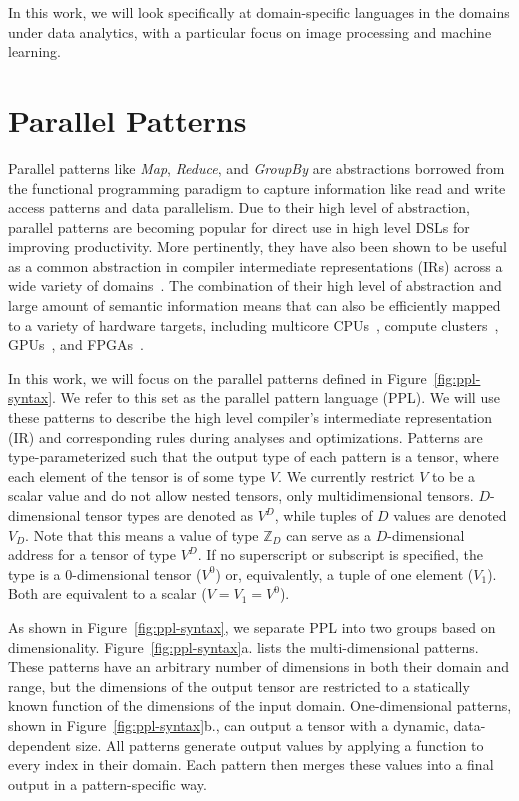 In this work, we will look specifically at domain-specific languages in the domains under
data analytics, with a particular focus on image processing and machine learning.


\section{Parallel Patterns}

Parallel patterns like \emph{Map}, \emph{Reduce}, and \emph{GroupBy} are abstractions
borrowed from the functional programming paradigm
to capture information like read and write access patterns and data parallelism.
Due to their high level of abstraction, parallel patterns are becoming
popular for direct use in high level DSLs for improving productivity.
More pertinently, they have also been shown to be useful as a common abstraction in compiler
intermediate representations (IRs) across a wide variety of domains~\cite{ecoop13sujeeth,pldi13halide}.
The combination of their high level of abstraction and large amount of semantic information
means that can also be efficiently mapped to a variety of hardware
targets, including multicore CPUs~\cite{scala,haskell,delite-tecs14},
compute clusters~\cite{mapreduce,zaharia10spark,spartan},
GPUs~\cite{catanzaro11copperhead,micro14lee},
and FPGAs~\cite{auerbach10lime,george14fpl}.



In this work, we will focus on the parallel patterns defined in Figure~\ref{fig:ppl-syntax}.
We refer to this set as the parallel pattern language (PPL).
We will use these patterns to describe the high level
compiler's intermediate representation (IR) and corresponding rules during analyses and optimizations.
Patterns are type-parameterized such that the output type of each pattern is a tensor, where each
element of the tensor is of some type $V$. We currently restrict $V$ to be a scalar value and
do not allow nested tensors, only multidimensional tensors.
$D$-dimensional tensor types are denoted as $V^D$, while tuples of $D$ values are
denoted $V_D$. Note that this means a value of type $\mathbb{Z}_D$ can serve as a $D$-dimensional address
for a tensor of type $V^D$.
If no superscript or subscript is specified, the type is a 0-dimensional tensor ($V^0$) or, equivalently, a tuple of one element ($V_1$).
Both are equivalent to a scalar ($V = V_1 = V^0$).

As shown in Figure~\ref{fig:ppl-syntax}, we separate PPL into two groups based on dimensionality.
Figure~\ref{fig:ppl-syntax}a. lists the multi-dimensional patterns.
These patterns have an arbitrary number of dimensions in both their domain and range,
but the dimensions of the output tensor
are restricted to a statically known function of the dimensions of the input domain.
One-dimensional patterns, shown in Figure~\ref{fig:ppl-syntax}b., can output a tensor with a dynamic, data-dependent size.
All patterns generate output values by applying a function to
every index in their domain. Each pattern then merges these values into a final
output in a pattern-specific way.

